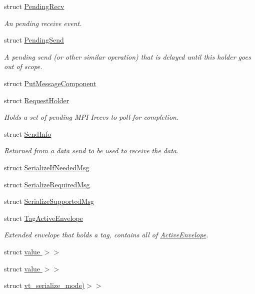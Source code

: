 \begin{DoxyCompactItemize}
struct \hyperlink{structvt_1_1messaging_1_1_pending_recv}{Pending\+Recv}
\begin{DoxyCompactList}\small\item\em An pending receive event. \end{DoxyCompactList}\item 
struct \hyperlink{structvt_1_1messaging_1_1_pending_send}{Pending\+Send}
\begin{DoxyCompactList}\small\item\em A pending send (or other similar operation) that is delayed until this holder goes out of scope. \end{DoxyCompactList}\item 
struct \hyperlink{structvt_1_1messaging_1_1_put_message_component}{Put\+Message\+Component}
\item 
struct \hyperlink{structvt_1_1messaging_1_1_request_holder}{Request\+Holder}
\begin{DoxyCompactList}\small\item\em Holds a set of pending M\+PI Irecvs to poll for completion. \end{DoxyCompactList}\item 
struct \hyperlink{structvt_1_1messaging_1_1_send_info}{Send\+Info}
\begin{DoxyCompactList}\small\item\em Returned from a data send to be used to receive the data. \end{DoxyCompactList}\item 
struct \hyperlink{structvt_1_1messaging_1_1_serialize_if_needed_msg}{Serialize\+If\+Needed\+Msg}
\item 
struct \hyperlink{structvt_1_1messaging_1_1_serialize_required_msg}{Serialize\+Required\+Msg}
\item 
struct \hyperlink{structvt_1_1messaging_1_1_serialize_supported_msg}{Serialize\+Supported\+Msg}
\item 
struct \hyperlink{structvt_1_1messaging_1_1_tag_active_envelope}{Tag\+Active\+Envelope}
\begin{DoxyCompactList}\small\item\em Extended envelope that holds a tag, contains all of {\ttfamily \hyperlink{structvt_1_1messaging_1_1_active_envelope}{Active\+Envelope}}. \end{DoxyCompactList}\item 
struct \hyperlink{structvt_1_1messaging_1_1_param_msg_3_01_tuple_00_01std_1_1enable__if__t_3_01is__byte__copyable_50e4a53750896883a846627550850f59}{value $>$$>$}
\item 
struct \hyperlink{structvt_1_1messaging_1_1_param_msg_3_01_tuple_00_01std_1_1enable__if__t_3_01not_01is__byte__copae27aaaf2bf1aaed1864cee3aebbc774}{value $>$$>$}
\item 
struct \hyperlink{structvt_1_1messaging_1_1msg__serialization__mode_3_01_message_t_00_01cxx14__void__t_3_01decltyp859af933e7cec0c00885df897a55208a}{vt\+\_\+serialize\+\_\+mode)$>$$>$}
\end{DoxyCompactItemize}
